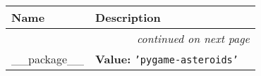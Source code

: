     \vspace{-1cm}
\hspace{\varindent}\begin{longtable}{|p{\varnamewidth}|p{\vardescrwidth}|l}
\cline{1-2}
\cline{1-2} \centering \textbf{Name} & \centering \textbf{Description}& \\
\cline{1-2}
\endhead\cline{1-2}\multicolumn{3}{r}{\small\textit{continued on next page}}\\\endfoot\cline{1-2}
\endlastfoot\raggedright \_\-\_\-p\-a\-c\-k\-a\-g\-e\-\_\-\_\- & \raggedright \textbf{Value:} 
{\tt \texttt{'}\texttt{pygame-asteroids}\texttt{'}}&\\
\cline{1-2}
\end{longtable}

